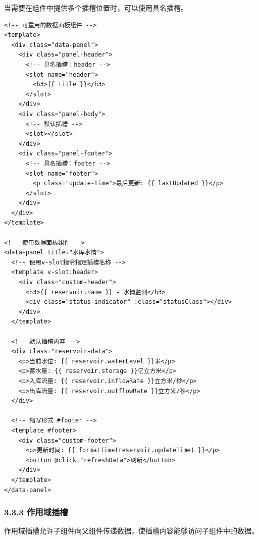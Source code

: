 当需要在组件中提供多个插槽位置时，可以使用具名插槽。

\begin{lstlisting}
<!-- 可重用的数据面板组件 -->
<template>
  <div class="data-panel">
    <div class="panel-header">
      <!-- 具名插槽：header -->
      <slot name="header">
        <h3>{{ title }}</h3>
      </slot>
    </div>
    <div class="panel-body">
      <!-- 默认插槽 -->
      <slot></slot>
    </div>
    <div class="panel-footer">
      <!-- 具名插槽：footer -->
      <slot name="footer">
        <p class="update-time">最后更新: {{ lastUpdated }}</p>
      </slot>
    </div>
  </div>
</template>

<!-- 使用数据面板组件 -->
<data-panel title="水库水情">
  <!-- 使用v-slot指令指定插槽名称 -->
  <template v-slot:header>
    <div class="custom-header">
      <h3>{{ reservoir.name }} - 水情监测</h3>
      <div class="status-indicator" :class="statusClass"></div>
    </div>
  </template>
  
  <!-- 默认插槽内容 -->
  <div class="reservoir-data">
    <p>当前水位: {{ reservoir.waterLevel }}米</p>
    <p>蓄水量: {{ reservoir.storage }}亿立方米</p>
    <p>入库流量: {{ reservoir.inflowRate }}立方米/秒</p>
    <p>出库流量: {{ reservoir.outflowRate }}立方米/秒</p>
  </div>
  
  <!-- 缩写形式 #footer -->
  <template #footer>
    <div class="custom-footer">
      <p>更新时间: {{ formatTime(reservoir.updateTime) }}</p>
      <button @click="refreshData">刷新</button>
    </div>
  </template>
</data-panel>
\end{lstlisting}

\subsubsection{3.3.3 作用域插槽}\label{ux4f5cux7528ux57dfux63d2ux69fd}

作用域插槽允许子组件向父组件传递数据，使插槽内容能够访问子组件中的数据。

